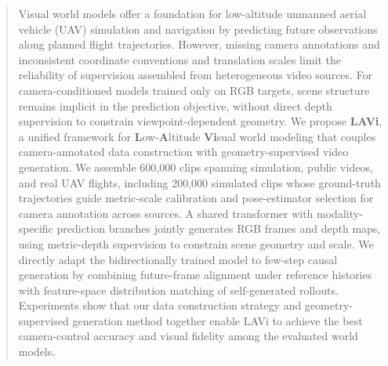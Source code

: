 \begin{abstract}
Visual world models offer a foundation for low-altitude unmanned aerial vehicle (UAV) simulation and navigation by predicting future observations along planned flight trajectories.
However, missing camera annotations and inconsistent coordinate conventions and translation scales limit the reliability of supervision assembled from heterogeneous video sources.
For camera-conditioned models trained only on RGB targets, scene structure remains implicit in the prediction objective, without direct depth supervision to constrain viewpoint-dependent geometry.
We propose \textbf{LAVi}, a unified framework for \textbf{L}ow-\textbf{A}ltitude \textbf{Vi}sual world modeling that couples camera-annotated data construction with geometry-supervised video generation.
We assemble 600,000 clips spanning simulation, public videos, and real UAV flights, including 200,000 simulated clips whose ground-truth trajectories guide metric-scale calibration and pose-estimator selection for camera annotation across sources.
A shared transformer with modality-specific prediction branches jointly generates RGB frames and depth maps, using metric-depth supervision to constrain scene geometry and scale.
We directly adapt the bidirectionally trained model to few-step causal generation by combining future-frame alignment under reference histories with feature-space distribution matching of self-generated rollouts.
Experiments show that our data construction strategy and geometry-supervised generation method together enable LAVi to achieve the best camera-control accuracy and visual fidelity among the evaluated world models.
\end{abstract}
